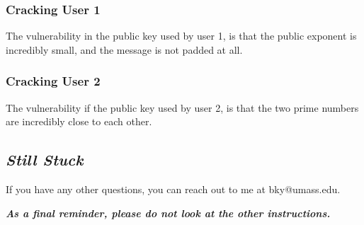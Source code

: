 {                        \subsubsection*{Cracking User 1}







                            The vulnerability in the public key used by user 1, is that the public exponent is incredibly small, and the message is not padded at all. 







                        \subsubsection*{Cracking User 2}







                            The vulnerability if the public key used by user 2, is that the two prime numbers are incredibly close to each other. 







                    \subsection*{\textit{Still Stuck}}







                        If you have any other questions, you can reach out to me at bky@umass.edu. 















                    \textbf{\textit{As a final reminder, please do not look at the other instructions.}}







            }







